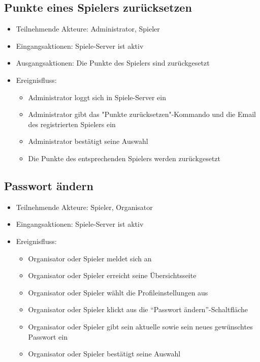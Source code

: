 \documentclass[a4paper]{scrreprt}
\begin{document}
    \subsection{Punkte eines Spielers zurücksetzen}
    \begin{itemize}
        \item Teilnehmende Akteure: \Gls{Administrator}, \Gls{Spieler}
        \item Eingangsaktionen: Spiele-Server ist aktiv
        \item Ausgangsaktionen: Die Punkte des Spielers sind zurückgesetzt
        \item Ereignisfluss:
        \begin{itemize}
            \item Administrator loggt sich in Spiele-Server ein
            \item Administrator gibt das "Punkte zurücksetzen"-Kommando und die Email des registrierten Spielers ein
            \item Administrator bestätigt seine Auswahl
            \item Die Punkte des entsprechenden Spielers werden zurückgesetzt
        \end{itemize}
    \end{itemize}




    \subsection{Passwort ändern}
    \begin{itemize}
    \item Teilnehmende Akteure: \Gls{Spieler}, \Gls{Organisator}
    \item Eingangsaktionen: Spiele-Server ist aktiv
    \item Ereignisfluss:
        \begin{itemize}
            \item Organisator oder Spieler meldet sich an
            \item Organisator oder Spieler erreicht seine Übersichtsseite
            \item Organisator oder Spieler wählt die Profileinstellungen aus
            \item Organisator oder Spieler klickt aus die \enquote{Passwort ändern}-Schaltfläche
            \item Organisator oder Spieler gibt sein aktuelle sowie sein neues gewünschtes Passwort ein
            \item Organisator oder Spieler bestätigt seine Auswahl
        \end{itemize}
    \end{itemize}
\end{document}
